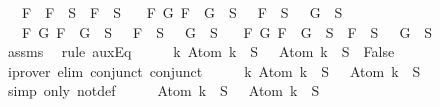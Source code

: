 \begin{isabellebody}
\ \ {\isasymand}\ {\isacharparenleft}{\isasymforall}F{\isachardot}\ \isactrlbold {\isasymnot}\ {\isacharparenleft}\isactrlbold {\isasymnot}F{\isacharparenright}\ {\isasymin}\ S\ {\isasymlongrightarrow}\ F\ {\isasymin}\ S{\isacharparenright}\isanewline
\ \ {\isasymand}\ {\isacharparenleft}{\isasymforall}F\ G{\isachardot}\ \isactrlbold {\isasymnot}{\isacharparenleft}F\ \isactrlbold {\isasymand}\ G{\isacharparenright}\ {\isasymin}\ S\ {\isasymlongrightarrow}\ \isactrlbold {\isasymnot}\ F\ {\isasymin}\ S\ {\isasymor}\ \isactrlbold {\isasymnot}\ G\ {\isasymin}\ S{\isacharparenright}\isanewline
\ \ {\isasymand}\ {\isacharparenleft}{\isasymforall}F\ G{\isachardot}\ \isactrlbold {\isasymnot}{\isacharparenleft}F\ \isactrlbold {\isasymor}\ G{\isacharparenright}\ {\isasymin}\ S\ {\isasymlongrightarrow}\ \isactrlbold {\isasymnot}\ F\ {\isasymin}\ S\ {\isasymand}\ \isactrlbold {\isasymnot}\ G\ {\isasymin}\ S{\isacharparenright}\isanewline
\ \ {\isasymand}\ {\isacharparenleft}{\isasymforall}F\ G{\isachardot}\ \isactrlbold {\isasymnot}{\isacharparenleft}F\ \isactrlbold {\isasymrightarrow}\ G{\isacharparenright}\ {\isasymin}\ S\ {\isasymlongrightarrow}\ F\ {\isasymin}\ S\ {\isasymand}\ \isactrlbold {\isasymnot}\ G\ {\isasymin}\ S{\isacharparenright}{\isachardoublequoteclose}\isanewline
\ \ \ \isamarkupfalse%
\ assms\ \isamarkupfalse%
\ {\isacharparenleft}rule\ auxEq{\isacharparenright}\isanewline
\ \ \isamarkupfalse%
\ \isamarkupfalse%
\ {\isachardoublequoteopen}{\isacharparenleft}{\isasymforall}k{\isachardot}\ Atom\ k\ {\isasymin}\ S\ {\isasymlongrightarrow}\ \isactrlbold {\isasymnot}\ {\isacharparenleft}Atom\ k{\isacharparenright}\ {\isasymin}\ S\ {\isasymlongrightarrow}\ False{\isacharparenright}{\isachardoublequoteclose}\isanewline
\ \ \ \ \isamarkupfalse%
\ {\isacharparenleft}iprover\ elim{\isacharcolon}\ conjunct{}\ conjunct{}{\isacharparenright}\isanewline
\ \ \isamarkupfalse%
\ \isamarkupfalse%
\ {\isachardoublequoteopen}{\isasymforall}k{\isachardot}\ Atom\ k\ {\isasymin}\ S\ {\isasymlongrightarrow}\ \isactrlbold {\isasymnot}\ {\isacharparenleft}Atom\ k{\isacharparenright}\ {\isasymnotin}\ S{\isachardoublequoteclose}\isanewline
\ \ \ \ \isamarkupfalse%
\ {\isacharparenleft}simp\ only{\isacharcolon}\ not{\isacharunderscore}def{\isacharparenright}\isanewline
\ \ \isamarkupfalse%
\ \isamarkupfalse%
\ {\isachardoublequoteopen}Atom\ k\ {\isasymin}\ S\ {\isasymlongrightarrow}\ \isactrlbold {\isasymnot}\ {\isacharparenleft}Atom\ k{\isacharparenright}\ {\isasymnotin}\ S{\isachardoublequoteclose}\isanewline

\end{isabellebody}
